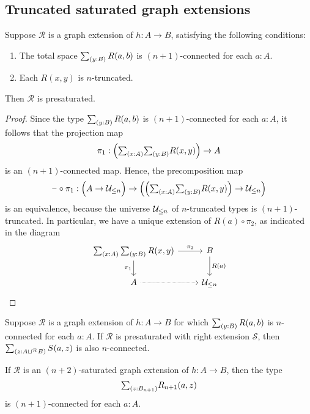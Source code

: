 \subsection{Truncated saturated graph extensions}

\begin{lem}
Suppose $\mathcal{R}$ is a graph extension of $h:A\to B$, satisfying the following conditions:
\begin{enumerate}
\item The total space $\sm{y:B}R(a,b)$ is $(n+1)$-connected for each $a:A$.
\item Each $R(x,y)$ is $n$-truncated.
\end{enumerate}
Then $\mathcal{R}$ is presaturated. 
\end{lem}

\begin{proof}
Since the type $\sm{y:B}R(a,b)$ is $(n+1)$-connected for each $a:A$, it follows that the projection map
\begin{equation*}
\pi_1 : \Big(\sm{x:A}{y:B}R(x,y)\Big)\to A
\end{equation*}
is an $(n+1)$-connected map. Hence, the precomposition map
\begin{equation*}
\blank\circ\pi_1 : \Big(A\to \UU_{\leq n}\Big)\to \Big(\Big(\sm{x:A}{y:B}R(x,y)\Big)\to \UU_{\leq n}\Big)
\end{equation*}
is an equivalence, because the universe $\mathcal{U}_{\leq n}$ of $n$-truncated types is $(n+1)$-truncated.
In particular, we have a unique extension of $R(a)\circ \pi_2$, as indicated in the diagram
\begin{equation*}
\begin{tikzcd}
\sm{x:A}{y:B}R(x,y) \arrow[r,"\pi_2"] \arrow[d,swap,"\pi_1"] & B \arrow[d,"R(a)"] \\
A \arrow[r,densely dotted] & \UU_{\leq n}
\end{tikzcd}
\end{equation*}
\end{proof}

\begin{lem}
Suppose $\mathcal{R}$ is a graph extension of $h:A\to B$ for which $\sm{y:B}R(a,b)$ is $n$-connected for each $a:A$. If $\mathcal{R}$ is presaturated with right extension $\mathcal{S}$, then $\sm{z:A\sqcup^{\mathcal{R}} B}S(a,z)$ is also $n$-connected.
\end{lem}

\begin{lem}
If $\mathcal{R}$ is an $(n+2)$-saturated graph extension of $h:A\to B$, then the type
\begin{equation*}
\sm{z:B_{n+1}}R_{n+1}(a,z)
\end{equation*}
is $(n+1)$-connected for each $a:A$.
\end{lem}

